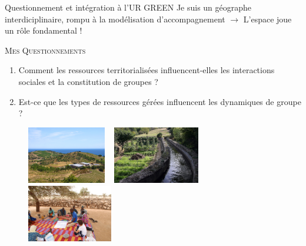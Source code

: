 \documentclass[newPxFont]{beamer}
\begin{document}
\begin{frame}{Questionnement et intégration à l'UR GREEN}
	\vspace{-2em}
  Je suis un \alert{\color{sthlmBlue}géographe} interdiciplinaire, rompu à la modélisation d'accompagnement $\rightarrow$ L'\alert{\color{sthlmBlue}espace} joue un rôle fondamental !
  \begin{block}{\textsc{Mes Questionnements}}
    \begin{enumerate}
      \item Comment les ressources territorialisées influencent-elles les interactions sociales et la constitution de groupes ?
      \item Est-ce que les types de ressources gérées influencent les dynamiques de groupe ?
    \end{enumerate}
	\end{block}
  \vspace{-1em}
  \begin{figure}
    \includegraphics[height=2.5cm]{img/coop_viti} ~
    \includegraphics[height=2.5cm]{img/coop_canal}~
    \includegraphics[height=2.5cm]{img/coop_peuls}
  \end{figure}
\end{frame}

\end{document}
